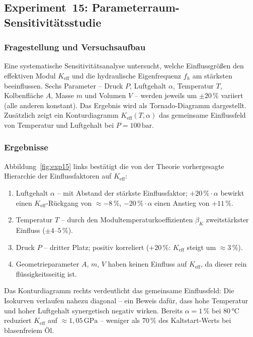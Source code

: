 ﻿\documentclass[a4paper,12pt]{scrreprt}
\theoremstyle{definition}
\begin{document}
\subsection{Experiment~15: Parameterraum-Sensitivitätsstudie}
\label{sec:exp15}

\subsubsection*{Fragestellung und Versuchsaufbau}

Eine systematische Sensitivitätsanalyse untersucht, welche
Einflussgrößen den effektiven Modul $K_{\mathrm{eff}}$ und die
hydraulische Eigenfrequenz $f_h$ am stärksten beeinflussen.
Sechs Parameter -- Druck $P$, Luftgehalt $\alpha$, Temperatur $T$,
Kolbenfläche $A$, Masse $m$ und Volumen $V$ -- werden jeweils um
$\pm 20\,\%$ variiert (alle anderen konstant). Das Ergebnis wird
als Tornado-Diagramm dargestellt. Zusätzlich zeigt ein
Konturdiagramm $K_{\mathrm{eff}}(T,\alpha)$ das gemeinsame Einflussfeld
von Temperatur und Luftgehalt bei $P = 100\,\mathrm{bar}$.

\subsubsection*{Ergebnisse}

Abbildung~\ref{fig:exp15} links bestätigt die von der Theorie vorhergesagte
Hierarchie der Einflussfaktoren auf $K_{\mathrm{eff}}$:
\begin{enumerate}
  \item Luftgehalt $\alpha$ -- mit Abstand der stärkste Einflussfaktor;
        $+20\,\%\cdot\alpha$ bewirkt einen $K_{\mathrm{eff}}$-Rückgang
        von $\approx -8\,\%$, $-20\,\%\cdot\alpha$ einen Anstieg von
        $+11\,\%$.
  \item Temperatur $T$ -- durch den Modultemperaturkoeffizienten
        $\beta_K$ zweitstärkster Einfluss ($\pm 4$--$5\,\%$).
  \item Druck $P$ -- dritter Platz; positiv korreliert ($+20\,\%$:
        $K_{\mathrm{eff}}$ steigt um $\approx 3\,\%$).
  \item Geometrieparameter $A$, $m$, $V$ haben keinen Einfluss auf
        $K_{\mathrm{eff}}$, da dieser rein flüssigkeitsseitig ist.
\end{enumerate}

Das Konturdiagramm rechts verdeutlicht das gemeinsame Einflussfeld:
Die Isokurven verlaufen nahezu diagonal -- ein Beweis dafür, dass hohe
Temperatur und hoher Luftgehalt synergetisch negativ wirken. Bereits
$\alpha = 1\,\%$ bei $80\, °\mathrm{C}$ reduziert $K_{\mathrm{eff}}$
auf $\approx 1{,}05\,\mathrm{GPa}$ -- weniger als $70\,\%$ des
Kaltstart-Werts bei blasenfreiem Öl.
\end{document}
